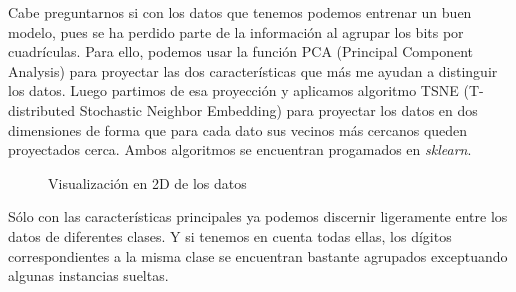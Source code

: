 \documentclass[a4]{article}
\begin{document}
Cabe preguntarnos si con los datos que tenemos podemos entrenar un
buen modelo, pues se ha perdido parte de la información al agrupar los
bits por cuadrículas. Para ello, podemos usar la función PCA
(Principal Component Analysis) para proyectar las dos características
que más me ayudan a distinguir los datos. Luego partimos de esa
proyección y aplicamos algoritmo TSNE (T-distributed Stochastic
Neighbor Embedding) para proyectar los datos en dos dimensiones de
forma que para cada dato sus vecinos más cercanos queden proyectados
cerca. Ambos algoritmos se encuentran progamados en \textit{sklearn}.

\begin{figure}[H]
  \centering
  \caption{Visualización en 2D de los datos}
  \label{fig:2D-projection}
\end{figure}
\vspace{-4mm}

Sólo con las características principales ya podemos discernir
ligeramente entre los datos de diferentes clases. Y si tenemos en
cuenta todas ellas, los dígitos correspondientes a la misma clase se
encuentran bastante agrupados exceptuando algunas instancias sueltas.
\end{document}
